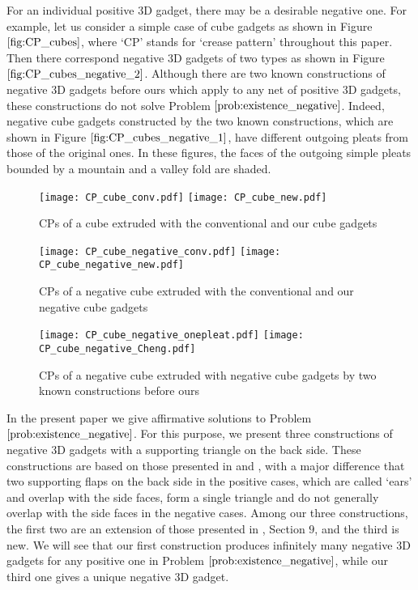 \documentclass[11pt]{amsart}
\numberwithin{equation}{section}
\numberwithin{theorem}{section}
\begin{document}
For an individual positive $3$D gadget, there may be a desirable negative one.
For example, let us consider a simple case of cube gadgets as shown in Figure $\ref{fig:CP_cubes}$,
where `CP' stands for `crease pattern' throughout this paper.
Then there correspond negative $3$D gadgets of two types as shown in Figure $\ref{fig:CP_cubes_negative_2}$.
Although there are two known constructions of negative $3$D gadgets before ours which apply to any net of positive $3$D gadgets,
these constructions do not solve Problem $\ref{prob:existence_negative}$.
Indeed, negative cube gadgets constructed by the two known constructions, which are shown in Figure $\ref{fig:CP_cubes_negative_1}$,
have different outgoing pleats from those of the original ones.
In these figures, the faces of the outgoing simple pleats bounded by a mountain and a valley fold are shaded.
\begin{figure}[htbp]
\addtocounter{theorem}{1}
\centering\texttt{[image: CP\_cube\_conv.pdf]}
\texttt{[image: CP\_cube\_new.pdf]}
    \caption{CPs of a cube extruded with the conventional and our cube gadgets}
    \label{fig:CP_cubes}
\end{figure}
\begin{figure}[htbp]
\addtocounter{theorem}{1}
\centering\texttt{[image: CP\_cube\_negative\_conv.pdf]}
\texttt{[image: CP\_cube\_negative\_new.pdf]}
    \caption{CPs of a negative cube extruded with the conventional and our negative cube gadgets}
    \label{fig:CP_cubes_negative_2}
\end{figure}
\begin{figure}[htbp]
\addtocounter{theorem}{1}
\centering\texttt{[image: CP\_cube\_negative\_onepleat.pdf]}
\texttt{[image: CP\_cube\_negative\_Cheng.pdf]}
    \caption{CPs of a negative cube extruded with negative cube gadgets by two known constructions before ours}
    \label{fig:CP_cubes_negative_1}
\end{figure}

In the present paper we give affirmative solutions to Problem $\ref{prob:existence_negative}$.
For this purpose, we present three constructions of negative $3$D gadgets with a supporting triangle on the back side.
These constructions are based on those presented in \cite{Doi19} and \cite{Doi20}, with a major difference that
two supporting flaps on the back side in the positive cases, which are called `ears' and overlap with the side faces,
form a single triangle and do not generally overlap with the side faces in the negative cases.
Among our three constructions, the first two are an extension of those presented in \cite{Doi19}, Section $9$, and the third is new.
We will see that our first construction produces infinitely many negative $3$D gadgets for any positive one in Problem $\ref{prob:existence_negative}$,
while our third one gives a unique negative $3$D gadget.
\end{document}
